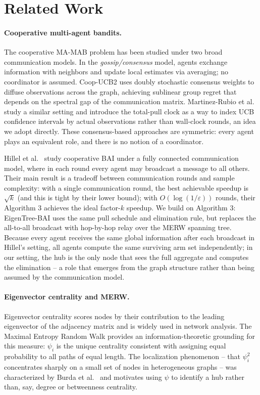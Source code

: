 \documentclass{article}
\newcommand{\merw}{EigenTree}
\begin{document}
\section{Related Work}
\label{sec:related}

\paragraph{Cooperative multi-agent bandits.}
The cooperative MA-MAB problem has been studied under two broad communication models. In the \emph{gossip/consensus} model, agents exchange information with neighbors and update local estimates via averaging; no coordinator is assumed. Coop-UCB2 \citep{landgren2021distributed} uses doubly stochastic consensus weights to diffuse observations across the graph, achieving sublinear group regret that depends on the spectral gap of the communication matrix. Martinez-Rubio et al.\ \citep{martinez2019decentralized} study a similar setting and introduce the total-pull clock as a way to index UCB confidence intervals by actual observations rather than wall-clock rounds, an idea we adopt directly. These consensus-based approaches are symmetric: every agent plays an equivalent role, and there is no notion of a coordinator.

Hillel et al.\ \citep{hillel2013distributed} study cooperative BAI under a fully connected communication model, where in each round every agent may broadcast a message to all others. Their main result is a tradeoff between communication rounds and sample complexity: with a single communication round, the best achievable speedup is $\sqrt{k}$ (and this is tight by their lower bound); with $O(\log(1/\varepsilon))$ rounds, their Algorithm 3 achieves the ideal factor-$k$ speedup. We build on Algorithm 3: \merw-BAI uses the same pull schedule and elimination rule, but replaces the all-to-all broadcast with hop-by-hop relay over the MERW spanning tree. Because every agent receives the same global information after each broadcast in Hillel's setting, all agents compute the same surviving arm set independently; in our setting, the hub is the only node that sees the full aggregate and computes the elimination -- a role that emerges from the graph structure rather than being assumed by the communication model.

\paragraph{Eigenvector centrality and MERW.}
Eigenvector centrality scores nodes by their contribution to the leading eigenvector of the adjacency matrix and is widely used in network analysis. The Maximal Entropy Random Walk \citep{burda2009localization} provides an information-theoretic grounding for this measure: $\psi_i$ is the unique centrality consistent with assigning equal probability to all paths of equal length. The localization phenomenon -- that $\psi_i^2$ concentrates sharply on a small set of nodes in heterogeneous graphs -- was characterized by Burda et al.\ \citep{burda2009localization} and motivates using $\psi$ to identify a hub rather than, say, degree or betweenness centrality.
\end{document}
